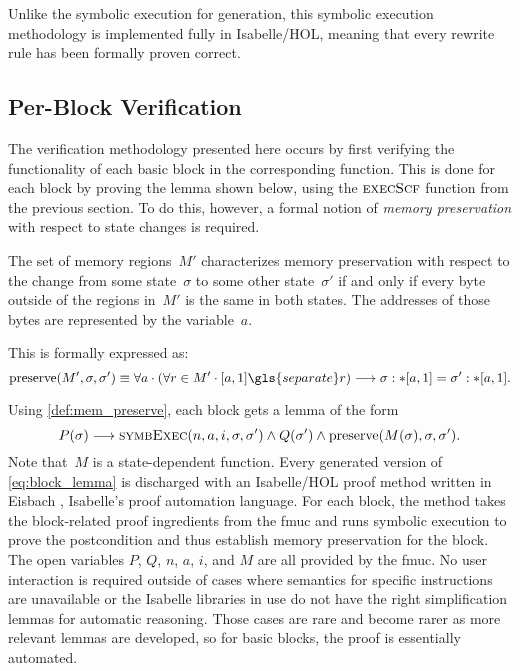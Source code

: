 Unlike the symbolic execution for generation,
this symbolic execution methodology is implemented fully in Isabelle/HOL,
meaning that every rewrite rule has been formally proven correct.

\subsection{Per-Block Verification}\label{sse:per-block}
The verification methodology presented here occurs
by first verifying the functionality of each basic block in the corresponding function.
This is done for each block by proving the lemma shown below,
using the $\operatorname{\textsc{execScf}}$ function from the previous section.
To do this, however, a formal notion of \emph{memory preservation}
with respect to state changes is required.
\begin{definition}\label{def:mem_preserve}
  The set of memory regions~$M'$ characterizes memory preservation with respect to
  the change from some state~$\sigma$ to some other state~$\sigma'$
  if and only if every byte outside of the regions in~$M'$ is the same in both states.
  The addresses of those bytes are represented by the variable~$a$.

  This is formally expressed as:
  \begin{equation}
    \usage(M',\sigma,\sigma')\equiv\forall a\cdot(\forall r\in M'\cdot\region{a}1\gls{separate}r)
    \longrightarrow\readmemS{\sigma}a{1}=\readmemS{\sigma'}a{1}.
  \end{equation}
\end{definition}

Using \cref{def:mem_preserve}, each block gets a lemma of the form
\begin{equation}
  P(\sigma)\longrightarrow\operatorname{\textsc{symbExec}}(n,a,i,\sigma,\sigma')\land
  Q(\sigma')\land\operatorname{preserve}(M(\sigma),\sigma,\sigma').\label{eq:block_lemma}
\end{equation}
Note that~$M$ is a state-dependent function.
Every generated version of \cref{eq:block_lemma} is discharged
with an Isabelle/HOL proof method written in Eisbach \autocite{matichuk2016eisbach},
Isabelle's proof automation language.
For each block, the method takes the block-related proof ingredients
from the \ac{fmuc} and runs symbolic execution
to prove the postcondition and thus establish memory preservation for the block.
The open variables $P$, $Q$, $n$, $a$, $i$, and $M$ are all provided by the \ac{fmuc}.
No user interaction is required outside of cases where semantics
for specific instructions are unavailable or the Isabelle libraries in use
do not have the right simplification lemmas for automatic reasoning.
Those cases are rare and become rarer as more relevant lemmas are developed,
so for basic blocks, the proof is essentially automated.

